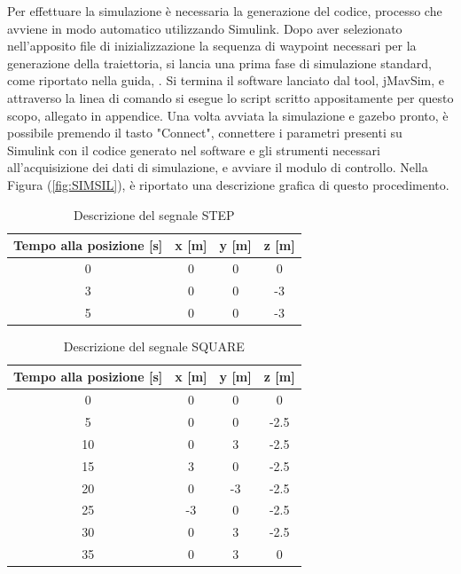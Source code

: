 Per effettuare la simulazione è necessaria la generazione del codice, processo che avviene in modo automatico utilizzando Simulink. Dopo aver selezionato nell'apposito file di inizializzazione la sequenza di waypoint necessari per la generazione della traiettoria, si lancia una prima fase di simulazione standard, come riportato nella guida, \cite{px4Guide}. Si termina il software lanciato dal tool, jMavSim, e attraverso la linea di comando si esegue lo script scritto appositamente per questo scopo, allegato in appendice.
Una volta avviata la simulazione e gazebo pronto, è possibile premendo il tasto "Connect", connettere i parametri presenti su Simulink con il codice generato nel software e gli strumenti necessari all'acquisizione dei dati di simulazione, e avviare il modulo di controllo. Nella Figura (\ref{fig:SIMSIL}), è riportato una descrizione grafica di questo procedimento.


\begin{table}
	\centering
	\caption{Descrizione del segnale STEP}
	\begin{tabular}{c c c c}
		\hline
		Tempo alla posizione [s] &  x [m] & y [m] & z [m]\\
		\hline
		0 & 0 & 0 & 0 \\
		3 & 0 & 0 & -3 \\
		5 & 0 & 0 & -3 \\
		\hline
	\end{tabular}	
	\label{tab:STEP}
\end{table}

\begin{table}
	\centering
	\caption{Descrizione del segnale SQUARE}
	\begin{tabular}{c c c c}
		\hline
		Tempo alla posizione [s] &  x [m] & y [m] & z [m]\\
		\hline
		0 & 0 & 0 & 0 \\
		5 & 0 & 0 & -2.5 \\
		10 & 0 & 3 & -2.5 \\
		15 & 3 & 0 & -2.5 \\
		20 & 0 & -3 & -2.5 \\
		25 & -3 & 0 & -2.5 \\
		30 & 0 & 3 & -2.5 \\
		35 & 0 & 3 & 0 \\
		\hline
	\end{tabular}	
	\label{tab:SQUARE}
\end{table}

